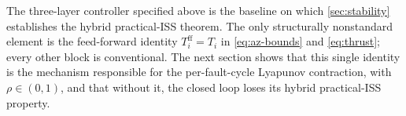 The three-layer controller specified above is the baseline on which \cref{sec:stability} establishes the hybrid practical-ISS theorem. The only structurally nonstandard element is the feed-forward identity $T_i^{\mathrm{ff}} = T_i$ in \eqref{eq:az-bounds} and \eqref{eq:thrust}; every other block is conventional. The next section shows that this single identity is the mechanism responsible for the per-fault-cycle Lyapunov contraction, with $\rho \in (0,1)$, and that without it, the closed loop loses its hybrid practical-ISS property.

